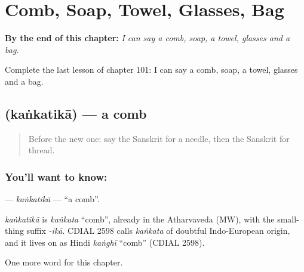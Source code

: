 
\chapter{Comb, Soap, Towel, Glasses, Bag}
\label{ch:sa-comb-soap-towel-glasses-bag}

\begin{chapteropening}
\textbf{By the end of this chapter:} \emph{I can say a comb, soap, a towel, glasses and a bag.}

Complete the last lesson of chapter 101: I can say a comb, soap, a towel, glasses and a bag.
\end{chapteropening}

\section[\texorpdfstring{\sk{कंकतिका} (kaṅkatikā)}{कंकतिका (kaṅkatikā)}]{ (kaṅkatikā) — a comb}

\label{lesson:SA-C101-kankatika}



\begin{quote}
Before the new one: say the Sanskrit for a needle, then the Sanskrit for thread.
\end{quote}

\subsection*{You'll want to know: }
\textbf{} — \emph{kaṅkatikā} — \textquotedblleft{}a comb\textquotedblright{}.

\begin{cousinweb}
\emph{kaṅkatikā} is \emph{kaṅkata} \textquotedblleft{}comb\textquotedblright{}, already in the Atharvaveda (MW), with the small-thing suffix \emph{-ikā}. CDIAL 2598 calls \emph{kaṅkata} of doubtful Indo-European origin, and it lives on as Hindi \emph{kaṅghī} \textquotedblleft{}comb\textquotedblright{} (CDIAL 2598).
\end{cousinweb}

\begin{grammarlens}[title={What you've built}]
One more word for this chapter.
\end{grammarlens}

